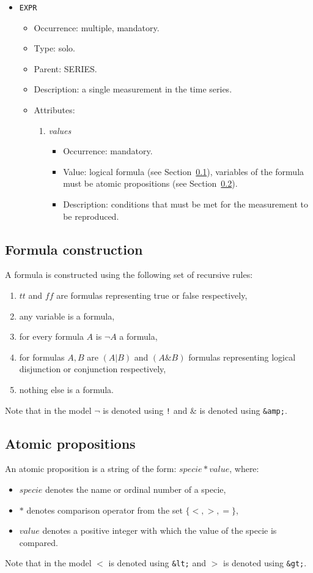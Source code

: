 \documentclass[12pt]{article}
\newenvironment{menum}{
\begin{enumerate}
  \setlength{\itemsep}{0pt}
  \setlength{\parskip}{0pt}
  \setlength{\parsep}{0pt}
}{\end{enumerate}}
\newenvironment{mitem}{
\begin{itemize}
  \setlength{\itemsep}{0pt}
  \setlength{\parskip}{0pt}
  \setlength{\parsep}{0pt}
}{\end{itemize}}
\begin{document}
\begin{mitem}
	\item \texttt{EXPR}
	\begin{mitem}
		\item Occurrence: multiple, mandatory.
		\item Type: solo.
		\item Parent: SERIES.
		\item Description: a single measurement in the time series.
		\item Attributes:	
		\begin{menum}
			\item \textit{values} 
			\begin{mitem}
				\item Occurrence: mandatory.
				\item Value: logical formula (see Section~\ref{FormulaConstruction}), variables of the formula must be atomic propositions (see Section~\ref{AtomicPropositions}).
				\item Description: conditions that must be met for the measurement to be reproduced.
			\end{mitem}
		\end{menum}
	\end{mitem}
\end{mitem}	

\subsection{Formula construction}
\label{FormulaConstruction}
A formula is constructed using the following set of recursive rules:
\begin{enumerate}
\item $tt$ and $ff$ are formulas representing true or false respectively,
\item any variable is a formula,
\item for every formula $A$ is $\neg A$ a formula,
\item for formulas $A,B$ are $(A|B)$ and $(A\&B)$ formulas representing logical disjunction or conjunction respectively,
\item nothing else is a formula.
\end{enumerate}
Note that in the model $\neg$ is denoted using \texttt{!} and $\&$ is denoted using \texttt{\&amp;}.

\subsection{Atomic propositions}
\label{AtomicPropositions}
An atomic proposition is a string of the form: $specie*value$, where:
\begin{itemize}
\item $specie$ denotes the name or ordinal number of a specie,
\item $*$ denotes comparison operator from the set $\{<,>,=\}$,
\item $value$ denotes a positive integer with which the value of the specie is compared.
\end{itemize}
Note that in the model $<$ is denoted using \texttt{\&lt;} and $>$ is denoted using \texttt{\&gt;}.
\end{document}
